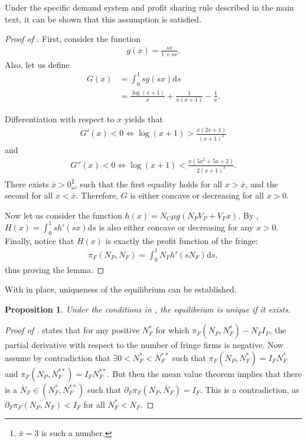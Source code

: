 \documentclass[a4paper]{article}
\newtheorem{proposition}{Proposition}
\newcommand{\ds}{\mathrm{d}s}
\begin{document}
Under the specific demand system and profit sharing rule described in the main text, it can be shown that this assumption is satisfied.
\begin{proof}[Proof of ]
    First, consider the function
    \begin{align*}
        g(x) = \frac{sx}{1 + sx}.
    \end{align*}
    Also, let us define
    \begin{align*}
        G(x) &= \int_0^1 s g(sx) \ds \\
        &= \frac{\log(x+1)}{x} + \frac{1}{x(x+1)} - \frac{1}{x}.
    \end{align*}

    Differentiation with respect to $x$ yields that
    \begin{align*}
        G'(x) < 0 \iff \log(x+1) > \frac{x (2x+1)}{(x+1)^2}
    \end{align*}
    and
    \begin{align*}
        G''(x) < 0 \iff \log(x+1) < \frac{x (5x^2 + 5x + 2)}{2 (x+1)^3}.
    \end{align*}
    There exists $\bar{x} > 0$\footnote{
        $\bar{x} = 3$ is such a number.
    }, such that the first equality holds for all $x > \bar{x}$, and the second for all $x < \bar{x}$.
    Therefore, $G$ is either concave or decreasing for all $x > 0$.

    Now let us consider the function $h(x) = N_C \mu g(N_P V_P + V_F x)$.
    By , $H(x) = \int_0^1 s h'(sx) \ds$ is also either concave or decreasing for any $x > 0$.
    Finally, notice that $H(x)$ is exactly the profit function of the fringe:
    \begin{align*}
        \pi_F(N_P, N_F) = \int_0^1 N_F h'(s N_F) \ds,
    \end{align*}
    thus proving the lemma.
\end{proof}


With  in place, uniqueness of the equilibrium can be established.
\begin{proposition}
    \label{prop:unique_equilibrium_more_general}
    Under the conditions in , the equilibrium is unique if it exists.
\end{proposition}
\begin{proof}[Proof of ]
     states that for any positive $N_F^*$ for which $\pi_F(N_P, N_F^*) - N_F I_F$, the partial derivative with respect to the number of fringe firms is negative.
    Now assume by contradiction that $\exists 0 < N_F^* < N_F^{**}$ such that $\pi_F(N_P, N_F^*) = I_F N_F^*$ and $\pi_F(N_P, N_F^{**}) = I_F N_F^{**}$.
    But then the mean value theorem implies that there is a $\bar{N}_F \in (N_F^*, N_F^{**})$ such that $\partial_F \pi_F(N_P, \bar{N}_F) = I_F$.
    This is a contradiction, as $\partial_F \pi_F(N_P, N_F) < I_F$ for all $N_F^* < N_F$.
\end{proof}
\end{document}
